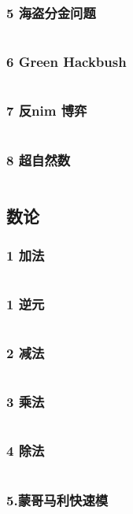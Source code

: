 \documentclass{article}
\begin{document}
\subsubsection{5 海盗分金问题}
\inputminted{c++}{/home/zzuzxy/t3/ACM-template/4 数学/博弈/5 海盗分金问题.cpp}
\subsubsection{6 Green Hackbush}
\inputminted{c++}{/home/zzuzxy/t3/ACM-template/4 数学/博弈/6 Green Hackbush.cpp}
\subsubsection{7 反nim 博弈}
\inputminted{c++}{/home/zzuzxy/t3/ACM-template/4 数学/博弈/7 反nim 博弈.cpp}
\subsubsection{8 超自然数}
\inputminted{c++}{/home/zzuzxy/t3/ACM-template/4 数学/博弈/8 超自然数.cpp}
\subsection{数论}
\subsubsection{1 加法}
\inputminted{c++}{/home/zzuzxy/t3/ACM-template/4 数学/数论/1 加法.cpp}
\subsubsection{1 逆元}
\inputminted{c++}{/home/zzuzxy/t3/ACM-template/4 数学/数论/1 逆元.cpp}
\subsubsection{2 减法}
\inputminted{c++}{/home/zzuzxy/t3/ACM-template/4 数学/数论/2 减法.cpp}
\subsubsection{3 乘法}
\inputminted{c++}{/home/zzuzxy/t3/ACM-template/4 数学/数论/3 乘法.cpp}
\subsubsection{4 除法}
\inputminted{c++}{/home/zzuzxy/t3/ACM-template/4 数学/数论/4 除法.cpp}
\subsubsection{5.蒙哥马利快速模}
\inputminted{c++}{/home/zzuzxy/t3/ACM-template/4 数学/数论/5.蒙哥马利快速模.cpp}
\end{document}
